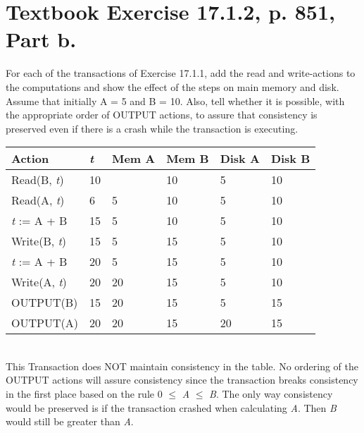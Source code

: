 \documentclass [letter,12pt] {article}
\begin{document}
\section{Textbook Exercise 17.1.2, p. 851, Part b.}
    For each of the transactions of Exercise 17.1.1, add the read and 
    write-actions to the computations and show the effect of the steps 
    on main memory and disk. Assume that initially A = 5 and B = 10. Also,
    tell whether it is possible, with the appropriate order of OUTPUT
    actions, to assure that consistency is preserved even if there is 
    a crash while the transaction is executing.
    \begin{table}[htp]
        \centering
        \begin{tabular}{l|l|l|l|l|l}
            Action      & \textit{t}  & Mem A & Mem B & Disk A & Disk B \\
            \hline
            Read(B, \textit{t})  & 10 &       & 10    & 5      & 10     \\
            Read(A, \textit{t})  & 6  & 5     & 10    & 5      & 10     \\
            \textit{t} := A + B  & 15 & 5     & 10    & 5      & 10     \\
            Write(B, \textit{t}) & 15 & 5     & 15    & 5      & 10     \\
            \textit{t} := A + B  & 20 & 5     & 15    & 5      & 10     \\
            Write(A, \textit{t}) & 20 & 20    & 15    & 5      & 10     \\
            OUTPUT(B)   & 15 & 20    & 15    & 5      & 15     \\
            OUTPUT(A)   & 20 & 20    & 15    & 20     & 15     \\      
        \end{tabular}
    \end{table}
    \\
    This Transaction does NOT maintain consistency in the table. No 
    ordering of the OUTPUT actions will assure consistency since the
    transaction breaks consistency in the first place based on the 
    rule 0 $\leq$ \textit{A} $\leq$ \textit{B}. The only way consistency
    would be preserved is if the transaction crashed when calculating 
    \textit{A}. Then \textit{B} would still be greater than \textit{A}.
\end{document}
